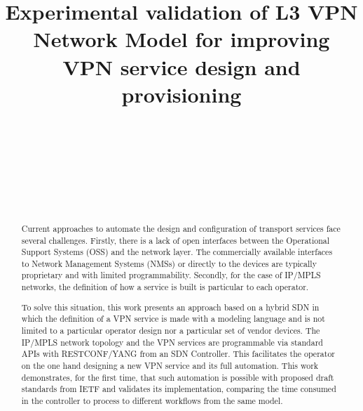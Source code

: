 \documentclass[conference]{IEEEtran}
\begin{document}
\title{Experimental validation of L3 VPN Network Model for improving VPN service design and provisioning}

\author{
\\
\and
{}
\\
\and
{}
\\
\and
{}
\\
}
\maketitle
\begin{abstract}
Current approaches to automate the design and configuration of transport services face several challenges. Firstly, there is a lack of open interfaces between the Operational Support Systems (OSS) and the network layer. The commercially available interfaces to Network Management Systems (NMSs) or directly to the devices are typically proprietary and with limited programmability. Secondly, for the case of IP/MPLS networks, the definition of how a service is built is particular to each operator.

To solve this situation, this work presents an approach based on a hybrid SDN in which the definition of a VPN service is made with a modeling language and is not limited to a particular operator design nor a particular set of vendor devices. The IP/MPLS network topology and the VPN services are programmable via standard APIs with RESTCONF/YANG from an SDN Controller. This facilitates the operator on the one hand designing a new VPN service and its full automation.  This work demonstrates, for the first time, that such automation is possible with proposed draft standards from IETF and validates its implementation, comparing the time consumed in the controller to process to different workflows from the same model.
\end{abstract}
\end{document}
